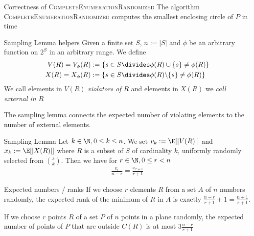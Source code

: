 \begin{theorem}[]{Correctness of \textsc{CompleteEnumerationRandomized}}
    The algorithm \textsc{CompleteEnumerationRandomized} computes the smallest enclosing circle of $P$ in time 
\end{theorem}


\begin{definition}[]{Sampling Lemma helpers}
    Given a finite set $S$, $n := |S|$ and $\phi$ be an arbitrary function on $2^S$ in an arbitrary range. We define
    \begin{align*}
        V(R) = V_{\phi}(R) & := \{ s \in S \divides \phi(R) \cup \{s\} \neq \phi(R) \}       \\
        X(R) = X_{\phi}(R) & := \{ s \in S \divides \phi(R) \backslash \{s\} \neq \phi(R) \}
    \end{align*}
    We call elements in $V(R)$ \textit{violators of} $R$ and elements in $X(R)$ we \textit{call external in} $R$
\end{definition}

The sampling lemma connects the expected number of violating elements to the number of external elements.
\begin{lemma}[]{Sampling Lemma}
    Let $k \in \N, 0 \leq k \leq n$. We set $v_k := \E[|V(R)|]$ and $x_k := \E[|X(R)|]$ where $R$ is a subset of $S$ of cardinality $k$, uniformly randomly selected from ${s \choose k}$. Then we have for $r \in \N, 0 \leq r <n$
    \begin{align*}
        \frac{v_r}{n - r} = \frac{x_{r + 1}}{r + 1}
    \end{align*}
\end{lemma}

\begin{corollary}[]{Expected numbers / ranks}
    If we choose $r$ elements $R$ from a set $A$ of $n$ numbers randomly, the expected rank of the minimum of $R$ in $A$ is exactly $\frac{n - r}{r + 1} + 1 = \frac{n + 1}{r + 1}$.

    If we choose $r$ points $R$ of a set $P$ of $n$ points in a plane randomly, the expected number of points of $P$ that are outside $C(R)$ is at most $3 \frac{n - r}{r + 1}$
\end{corollary}
